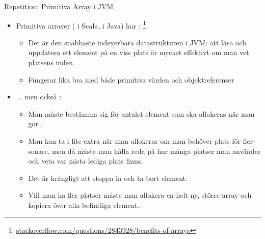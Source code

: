 \begin{Slide}{Repetition: Primitiva Array i JVM}
\begin{itemize}
\item Primitiva arrayer ( i Scala, \code{[]} i Java) har :%
\footnote{\href{http://stackoverflow.com/questions/2843928/benefits-of-arrays}{stackoverflow.com/questions/2843928/benefits-of-arrays}}
\begin{itemize}\footnotesize
\item Det är den snabbaste indexerbara datastrukturen i JVM: att läsa och uppdatera ett element på en viss plats är mycket effektivt om man vet platsens index.
\item Fungerar lika bra med både primitiva värden och objektreferenser
\end{itemize}
\item ... men också :
\begin{itemize}\footnotesize
\item Man måste bestämma sig för antalet element som ska allokeras när man gör .
\item Man kan ta i lite extra när man allokerar om man behöver plats för fler senare, men då måste man hålla reda på hur många platser man använder och veta var nästa lediga plats finns.
\item Det är krångligt att stoppa in  och ta bort  element.
\item Vill man ha fler platser måste man allokera en helt ny, större array och kopiera över alla befintliga element.
\end{itemize}

\end{itemize}
\end{Slide}




